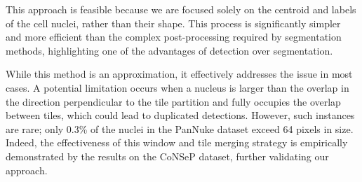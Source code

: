 This approach is feasible because we are focused solely on the centroid and labels of the cell nuclei, rather than their shape. This process is significantly simpler and more efficient than the complex post-processing required by segmentation methods, highlighting one of the advantages of detection over segmentation.

While this method is an approximation, it effectively addresses the issue in most cases. A potential limitation occurs when a nucleus is larger than the overlap in the direction perpendicular to the tile partition and fully occupies the overlap between tiles, which could lead to duplicated detections. However, such instances are rare; only 0.3\% of the nuclei in the PanNuke dataset exceed 64 pixels in size. Indeed, the effectiveness of this window and tile merging strategy is empirically demonstrated by the results on the CoNSeP dataset, further validating our approach.
